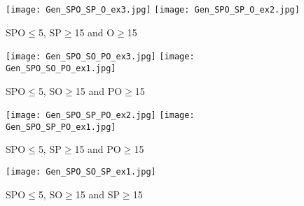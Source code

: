 \documentclass[runningheads]{llncs}
\begin{document}
\begin{figure}[h!]
\centering
   \caption{SPO$\le$5, SP$\ge$15 and O$\ge$15 }
   \texttt{[image: Gen\_SPO\_SP\_O\_ex3.jpg]}
   \texttt{[image: Gen\_SPO\_SP\_O\_ex2.jpg]}
\end{figure}


\clearpage

\begin{figure}[h!]
\centering
   \caption{SPO$\le$5, SO$\ge$15 and PO$\ge$15 }
   \texttt{[image: Gen\_SPO\_SO\_PO\_ex3.jpg]}
   \texttt{[image: Gen\_SPO\_SO\_PO\_ex1.jpg]}
\end{figure}

\clearpage






\begin{figure}[h!]
\centering
   \caption{SPO$\le$5, SP$\ge$15 and PO$\ge$15 }
   \texttt{[image: Gen\_SPO\_SP\_PO\_ex2.jpg]}
      \texttt{[image: Gen\_SPO\_SP\_PO\_ex1.jpg]}
\end{figure}




\clearpage


\begin{figure}[h!]
\centering
   \caption{SPO$\le$5, SO$\ge$15 and SP$\ge$15 }
   \texttt{[image: Gen\_SPO\_SO\_SP\_ex1.jpg]}
\end{figure}

\clearpage
\end{document}
